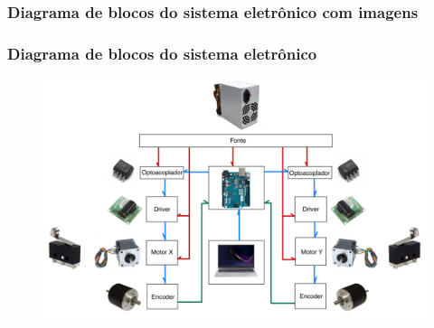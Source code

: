 \subsubsection{Diagrama de blocos do sistema eletrônico com imagens}

\begin{frame}
\frametitle{Diagrama de blocos do sistema eletrônico}

\begin{figure}
\centering
\includegraphics[scale = 0.35]{figs/diagramblocoscomimagens}
\end{figure}

\end{frame}
